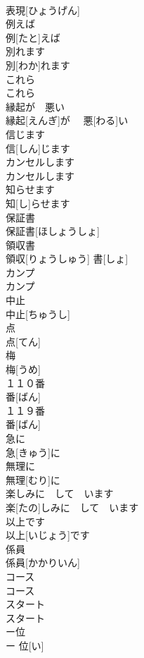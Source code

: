 \documentclass[8pt]{extreport}
\begin{document}
\begin{CJK}{UTF8}{min}
\\	表現[ひょうげん]	
\\	例えば	
\\	例[たと]えば	
\\	別れます	
\\	別[わか]れます	
\\	これら	
\\	これら	
\\	縁起が　悪い	
\\	縁起[えんぎ]が　 悪[わる]い	
\\	信じます	
\\	信[しん]じます	
\\	カンセルします	
\\	カンセルします	
\\	知らせます	
\\	知[し]らせます	
\\	保証書	
\\	保証書[ほしょうしょ]	
\\	領収書	
\\	領収[りょうしゅう] 書[しょ]	
\\	カンプ	
\\	カンプ	
\\	中止	
\\	中止[ちゅうし]	
\\	点	
\\	点[てん]	
\\	梅	
\\	梅[うめ]	
\\	１１０番	
\\	番[ばん]	
\\	１１９番	
\\	番[ばん]	
\\	急に	
\\	急[きゅう]に	
\\	無理に	
\\	無理[むり]に	
\\	楽しみに　して　います	
\\	楽[たの]しみに　して　います	
\\	以上です	
\\	以上[いじょう]です	
\\	係員	
\\	係員[かかりいん]	
\\	コース	
\\	コース	
\\	スタート	
\\	スタート	
\\	ー位	
\\	ー 位[い]	

\end{CJK}
\end{document}
